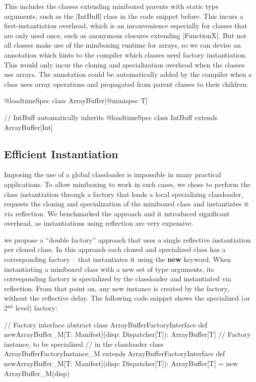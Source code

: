  This includes the classes extending miniboxed parents with static type arguments, such as the |IntBuff| class in the code snippet before. This incurs a first-instantiation overhead, which is an inconvenience especially for classes that are only used once, such as anonymous closures extending |FunctionX|. But not all classes make use of the miniboxing runtime for arrays, so we can devise an annotation which hints to the compiler which classes need factory instantiation. This would only incur the cloning and specialization overhead when the classes use arrays. The annotation could be automatically added by the compiler when a class uses array operations and propagated from parent classes to their children:

\begin{lstlisting-nobreak}
 @loadtimeSpec
 class ArrayBuffer[@minispec T]

 // IntBuff automatically inherits @loadtimeSpec
 class IntBuff extends ArrayBuffer[Int]
\end{lstlisting-nobreak}

\subsection{Efficient Instantiation}
\label{mbox:subsec-runtime-instantiation}

Imposing the use of a global classloader is impossible in many practical applications. To allow miniboxing to work in such cases, we chose to perform the class instantiation through a factory that loads a local specializing classloader, requests the cloning and specialization of the miniboxed class and instantiates it via reflection. We benchmarked the approach and it introduced significant overhead, as instantiations using reflection are very expensive.

 we propose a ``double factory'' approach that uses a single reflective instantiation per cloned class. In this approach each cloned and specialized class has a corresponding factory -- that instantiates it using the {\bf new} keyword. When instantiating a miniboxed class with a new set of type arguments, its corresponding factory is specialized by the classloader and instantiated via reflection. From that point on, any new instance is created by the factory, without the reflective delay. The following code snippet shows the specialized (or 2$^\text{nd}$ level) factory:

\begin{lstlisting-nobreak}
 // Factory interface
 abstract class ArrayBufferFactoryInterface {
   def newArrayBuffer_M[T: Manifest](disp: Dispatcher[T]): ArrayBuffer[T]
 }
 // Factory instance, to be specialized
 // in the classloader
 class ArrayBufferFactoryInstance_M extends ArrayBufferFactoryInterface {
   def newArrayBuffer_M[T: Manifest](disp: Dispatcher[T]): ArrayBuffer[T] =
     new ArrayBuffer_M(disp)
 }
\end{lstlisting-nobreak}
